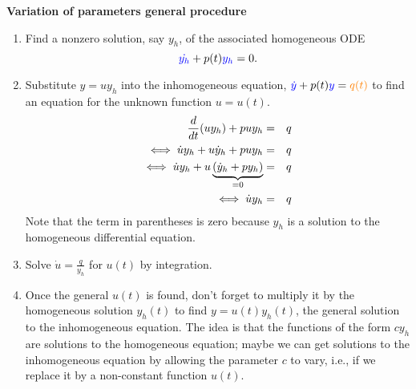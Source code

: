 \textbf{\color{blue} Variation of parameters general procedure}
\begin{enumerate}
\item Find a nonzero solution, say $y_h$, of the associated homogeneous ODE
  \begin{equation*}
    {\color{blue}{\dot{y_ h}}}  + p(t){\color{blue}{y_ h}}  = 0.
  \end{equation*}
\item Substitute $y = uy_h$ into the inhomogeneous equation,
  ${\color{blue}{\dot{y}}}  + p(t) {\color{blue}{y}}  = {\color{orange}{q(t)}}$ to find an equation
  for the unknown function $u = u(t)$.
  \begin{eqnarray*}
    \displaystyle  \displaystyle \frac{d}{dt}(uy_ h) +puy_ h &\displaystyle =& \displaystyle  q\\
    \displaystyle \iff \dot u y_ h + u\dot y_ h + puy_ h &\displaystyle =& \displaystyle  q\\
    \displaystyle \iff \dot u y_ h + u \underbrace{(\dot y_ h + py_ h)}_{=0}
                                                             &\displaystyle =& \displaystyle  q\\
    \displaystyle \iff \dot u y_ h &\displaystyle =& \displaystyle  q
  \end{eqnarray*}
  Note that the term in parentheses is zero because
  $y_h$ is a solution to the homogeneous differential equation.
\item Solve $\displaystyle \dot{u} \displaystyle = \displaystyle \frac{q}{y_h}$
  for $u(t)$ by integration.
\item Once the general $u(t)$ is found, don't forget to multiply it
  by the homogeneous solution $y_h(t)$ to find $y = u(t)y_h(t)$,
  the general solution to the inhomogeneous equation.
  The idea is that the functions of the form $cy_h$ are solutions to the homogeneous equation;
  maybe we can get solutions to the inhomogeneous equation by allowing the parameter $c$ to vary, i.e.,
  if we replace it by a non-constant function $u(t)$.
\end{enumerate}

